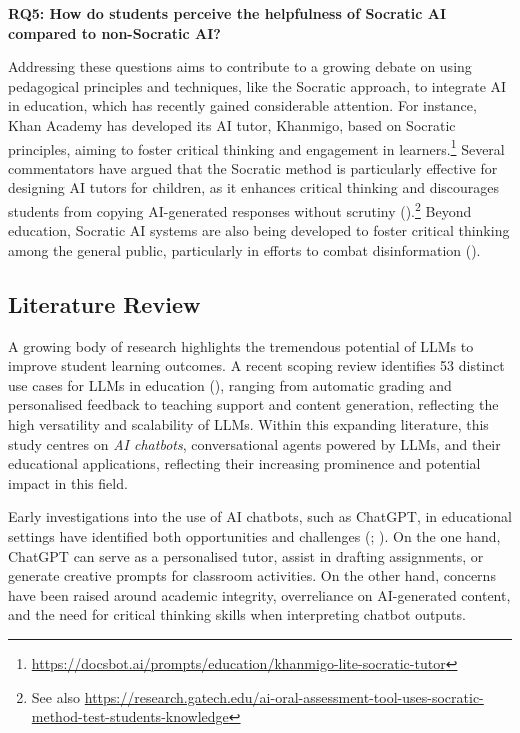 \documentclass[
  12pt,
]{article}
\begin{document}
\textbf{RQ5: How do students perceive the helpfulness of Socratic AI compared to non-Socratic AI?}

Addressing these questions aims to contribute to a growing debate on using pedagogical principles and techniques, like the Socratic approach, to integrate AI in education, which has recently gained considerable attention. For instance, Khan Academy has developed its AI tutor, Khanmigo, based on Socratic principles, aiming to foster critical thinking and engagement in learners.\footnote{\url{https://docsbot.ai/prompts/education/khanmigo-lite-socratic-tutor}} Several commentators have argued that the Socratic method is particularly effective for designing AI tutors for children, as it enhances critical thinking and discourages students from copying AI-generated responses without scrutiny ().\footnote{See also \url{https://research.gatech.edu/ai-oral-assessment-tool-uses-socratic-method-test-students-knowledge}} Beyond education, Socratic AI systems are also being developed to foster critical thinking among the general public, particularly in efforts to combat disinformation ().

\subsection{Literature Review}\label{literature-review}

A growing body of research highlights the tremendous potential of LLMs to improve student learning outcomes. A recent scoping review identifies 53 distinct use cases for LLMs in education (), ranging from automatic grading and personalised feedback to teaching support and content generation, reflecting the high versatility and scalability of LLMs. Within this expanding literature, this study centres on \emph{AI chatbots}, conversational agents powered by LLMs, and their educational applications, reflecting their increasing prominence and potential impact in this field.

Early investigations into the use of AI chatbots, such as ChatGPT, in educational settings have identified both opportunities and challenges (; ). On the one hand, ChatGPT can serve as a personalised tutor, assist in drafting assignments, or generate creative prompts for classroom activities. On the other hand, concerns have been raised around academic integrity, overreliance on AI-generated content, and the need for critical thinking skills when interpreting chatbot outputs.
\end{document}

